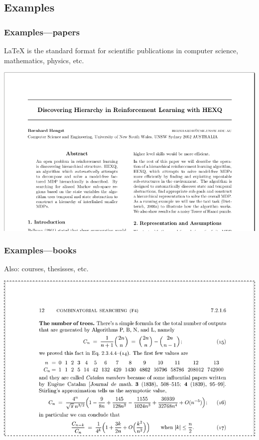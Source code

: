 \documentclass{beamer}
\begin{document}
\begin{frame}
\begin{columns}[c]
  \end{columns}
\end{frame}

\subsection{Examples}

\begin{frame}
  \frametitle{Examples---papers}

  {\LaTeX} is the standard format for scientific publications in computer science, mathematics, physics, etc.

  \begin{center}
  \includegraphics[height=.6\textheight]{img/oef1-03}
  \end{center}

\end{frame}

\begin{frame}
  \frametitle{Examples---books}

  Also: courses, thesisses, etc.

  \begin{center}
	\includegraphics[height=.6\textheight]{img/oef1-04}
  \end{center}

\end{frame}
\end{document}
